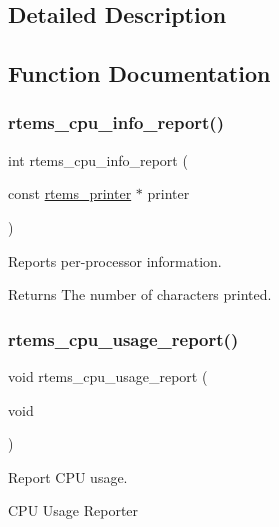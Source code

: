 \subsection{Detailed Description}


\subsection{Function Documentation}
\mbox{\label{group__libmisc__cpuuse_gaf6abf25be4a36f4f36e44b9b5bedb6d5}} 
\subsubsection{\texorpdfstring{rtems\_cpu\_info\_report()}{rtems\_cpu\_info\_report()}}
{\footnotesize\ttfamily int rtems\+\_\+cpu\+\_\+info\+\_\+report (\begin{DoxyParamCaption}\item[{const \mbox{\hyperlink{structrtems__printer}{rtems\+\_\+printer}} $\ast$}]{printer }\end{DoxyParamCaption})}



Reports per-\/processor information. 

\begin{DoxyReturn}{Returns}
The number of characters printed. 
\end{DoxyReturn}
\mbox{\label{group__libmisc__cpuuse_gadb8847280947582f897b8b544dee213f}} 
\subsubsection{\texorpdfstring{rtems\_cpu\_usage\_report()}{rtems\_cpu\_usage\_report()}}
{\footnotesize\ttfamily void rtems\+\_\+cpu\+\_\+usage\+\_\+report (\begin{DoxyParamCaption}\item[{void}]{ }\end{DoxyParamCaption})}



Report C\+PU usage. 

C\+PU Usage Reporter \mbox{\label{group__libmisc__cpuuse_gac38d4e3385e0c7307035d828e74ace97}} 
